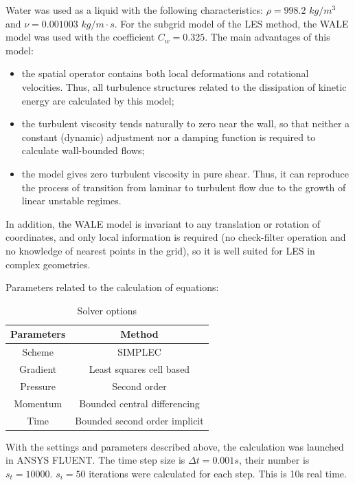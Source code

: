 	Water was used as a liquid with the following characteristics: $\rho = 998.2$ $kg/m^3$ and $\nu = 0.001003$ $kg/m\cdot s$. For the subgrid model of the LES method, the WALE model was used with the coefficient $C_w = 0.325$. The main advantages of this model:
	\begin{itemize}
		\item the spatial operator contains both local deformations and rotational velocities. Thus, all turbulence structures related to the dissipation of kinetic energy are calculated by this model;
		\item the turbulent viscosity tends naturally to zero near the wall, so that neither a constant (dynamic) adjustment nor a damping function is required to calculate wall-bounded flows;
		\item the model gives zero turbulent viscosity in pure shear. Thus, it can reproduce the process of transition from laminar to turbulent flow due to the growth of linear unstable regimes.
	\end{itemize}
	In addition, the WALE model is invariant to any translation or rotation of coordinates, and only local information is required (no check-filter operation and no knowledge of nearest points in the grid), so it is well suited for LES in complex geometries\cite{Nicoud1999}.
	
	Parameters related to the calculation of equations:
	\begin{table}[H]
		\begin{center}
			\begin{tabular}{|c|c|}
				\hline
				Parameters & Method\\
				\hline
				Scheme & SIMPLEC \\
				\hline
				Gradient & Least squares cell based\\
				\hline
				Pressure & Second order\\
				\hline
				Momentum & Bounded central differencing\\
				\hline
				Time & Bounded second order implicit\\
				\hline
			\end{tabular}
		\end{center}
		\caption{\footnotesize{Solver options}}
	\end{table}
	With the settings and parameters described above, the calculation was launched in ANSYS FLUENT. The time step size is $\Delta t = 0.001 s$, their number is $s_t = 10000$. $s_i = 50$ iterations were calculated for each step. This is 10s real time.